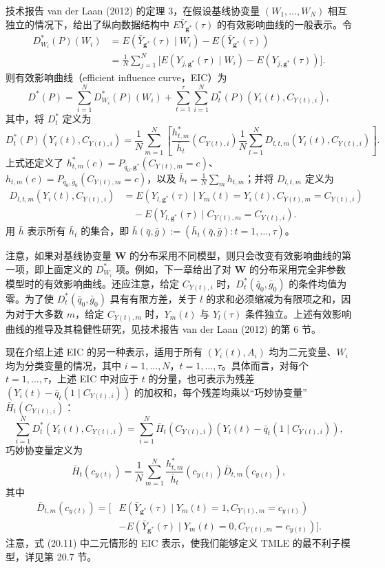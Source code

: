 技术报告 van der Laan (2012) 的定理 3，在假设基线协变量 $(W_1,\ldots,W_N)$ 相互独立的情况下，给出了纵向数据结构中 $E\bar Y_{\mathbf g^*}(\tau)$ 的有效影响曲线的一般表示。令
\[
\begin{aligned}
 D^*_{W_i}(P)(W_i)
 &=E(\bar Y_{\mathbf g^*}(\tau)\mid W_i)-E(\bar Y_{\mathbf g^*}(\tau))\\
 &=\frac1N\sum_{j=1}^N\bigl[E(Y_{j,\mathbf g^*}(\tau)\mid W_i)
        -E(Y_{j,\mathbf g^*}(\tau))\bigr].
\end{aligned}
\]
则有效影响曲线（efficient influence curve，EIC）为
\begin{equation}
 D^*(P)=\sum_{i=1}^ND^*_{W_i}(P)(W_i)
       +\sum_{t=1}^\tau\sum_{i=1}^ND_t^*(P)(Y_i(t),C_{Y(t),i}),
 \tag{20.10}
\end{equation}
其中，将 $D_t^*$ 定义为
\[
 D_t^*(P)(Y_i(t),C_{Y(t),i})
 =\frac1N\sum_{m=1}^N\left[
    \frac{h^*_{t,m}}{\bar h_t}(C_{Y(t),i})
    \frac1N\sum_{l=1}^ND_{l,t,m}(Y_i(t),C_{Y(t),i})\right].
\]
上式还定义了 $h^*_{t,m}(c)=P_{\bar q_0,\mathbf g^*}(C_{Y(t),m}=c)$、$h_{t,m}(c)=P_{\bar q_0,\bar g_0}(C_{Y(t),m}=c)$，以及 $\bar h_t=\frac1N\sum_mh_{t,m}$；并将 $D_{l,t,m}$ 定义为
\[
\begin{aligned}
 D_{l,t,m}(Y_i(t),C_{Y(t),i})
 &=E(Y_{l,\mathbf g^*}(\tau)\mid Y_m(t)=Y_i(t),C_{Y(t),m}=C_{Y(t),i})\\
 &\quad{}-E(Y_{l,\mathbf g^*}(\tau)\mid C_{Y(t),m}=C_{Y(t),i}).
\end{aligned}
\]
用 $\bar h$ 表示所有 $\bar h_t$ 的集合，即 $\bar h(\bar q,\bar g):=(\bar h_t(\bar q,\bar g):t=1,\ldots,\tau)$。

注意，如果对基线协变量 $\mathbf W$ 的分布采用不同模型，则只会改变有效影响曲线的第一项，即上面定义的 $D^*_{W_i}$ 项。例如，下一章给出了对 $\mathbf W$ 的分布采用完全非参数模型时的有效影响曲线。还应注意，给定 $C_{Y(t),i}$ 时，$D_t^*(\bar q_0,\bar g_0)$ 的条件均值为零。为了使 $D_t^*(\bar q_0,\bar g_0)$ 具有有限方差，关于 $l$ 的求和必须缩减为有限项之和，因为对于大多数 $m$，给定 $C_{Y(t),m}$ 时，$Y_m(t)$ 与 $Y_l(\tau)$ 条件独立。上述有效影响曲线的推导及其稳健性研究，见技术报告 van der Laan (2012) 的第 6 节。

现在介绍上述 EIC 的另一种表示，适用于所有 $(Y_i(t),A_i)$ 均为二元变量、$W_i$ 均为分类变量的情况，其中 $i=1,\ldots,N$，$t=1,\ldots,\tau$。具体而言，对每个 $t=1,\ldots,\tau$，上述 EIC 中对应于 $t$ 的分量，也可表示为残差 $(Y_i(t)-\bar q_t(1\mid C_{Y(t),i}))$ 的加权和，每个残差均乘以“巧妙协变量”$\bar H_t(C_{Y(t),i})$：
\begin{equation}
 \sum_{i=1}^ND_t^*(Y_i(t),C_{Y(t),i})
 =\sum_{i=1}^N\bar H_t(C_{Y(t),i})
       (Y_i(t)-\bar q_t(1\mid C_{Y(t),i})),
 \tag{20.11}
\end{equation}
巧妙协变量定义为
\[
 \bar H_t(c_{y(t)})=\frac1N\sum_{m=1}^N
       \frac{h^*_{t,m}}{\bar h_t}(c_{y(t)})\bar D_{t,m}(c_{y(t)}),
\]
其中
\[
\begin{aligned}
 \bar D_{t,m}(c_{y(t)})
 =\bigl[&E(\bar Y_{\mathbf g^*}(\tau)\mid Y_m(t)=1,C_{Y(t),m}=c_{y(t)})\\
       &-E(\bar Y_{\mathbf g^*}(\tau)\mid Y_m(t)=0,C_{Y(t),m}=c_{y(t)})\bigr].
\end{aligned}
\]
注意，式 (20.11) 中二元情形的 EIC 表示，使我们能够定义 TMLE 的最不利子模型，详见第 20.7 节。
